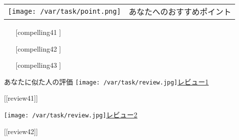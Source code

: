 \documentclass[lualatex,paper=a4,airticle]{jlreq}
\begin{document}
\begin{minipage}[b][0.43\textheight][t]{\textwidth}
\begin{multicols}{2}
    \hspace{-2.3cm} %
    \begin{minipage}{1.25\columnwidth}
      \vspace{-0.4cm}
      \begin{itembox}[l]{
        \begin{tabular}{@{}m{9mm}@{}m{6cm}}
          \texttt{[image: /var/task/point.png]} & \gtfamily\ebseries\large あなたへのおすすめポイント
        \end{tabular}
      }
        \vspace{-1\baselineskip}
        \begin{itemize}
          \setlength{\itemindent}{-10pt}
          \item [[compelling41]]
          \item [[compelling42]]
          \item [[compelling43]]
        \end{itemize}
      \end{itembox}
    \end{minipage}


    \hspace{-2.3cm} %
    \begin{minipage}{1.25\columnwidth}
      \begin{itembox}[l]{{\gtfamily\ebseries\large あなたに似た人の評価}}
        \vspace{-3mm}
        \texttt{[image: /var/task/review.jpg]}\href{[[review_url41]]}{\color{blue}\underline{レビュー1}}\par
        \begin{spacing}{0.5}
          {\small [[review41]]}\par
        \end{spacing}
        \vspace{2mm}
        \texttt{[image: /var/task/review.jpg]}\href{[[review_url42]]}{\color{blue}\underline{レビュー2}}\par
        \begin{spacing}{0.5}
          {\small [[review42]]}\par
        \end{spacing}
        \vspace{2mm}
      \end{itembox}
    \end{minipage}

  \end{multicols}
\end{minipage}
\end{document}
